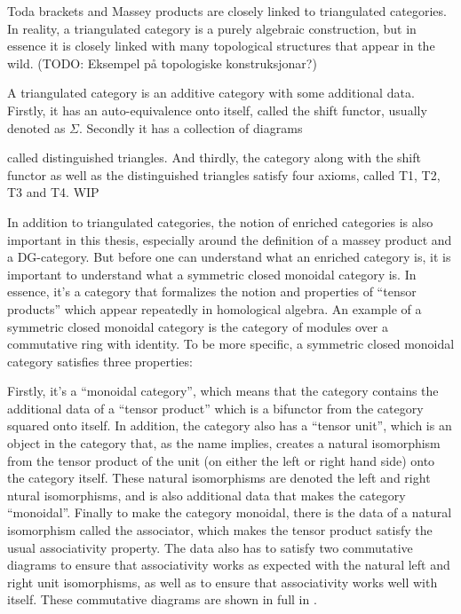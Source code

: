 Toda brackets and Massey products are closely linked to triangulated categories. In reality, a triangulated category is a purely algebraic construction, but in essence it is closely linked with many topological structures that appear in the wild. (TODO: Eksempel på topologiske konstruksjonar?)

A triangulated category is an additive category with some additional data. Firstly, it has an auto-equivalence onto itself, called the shift functor, usually denoted as \( \Sigma \). Secondly it has a collection of diagrams
\begin{center}
\end{center}
called distinguished triangles. And thirdly, the category along with the shift functor as well as the distinguished triangles satisfy four axioms, called T1, T2, T3 and T4. WIP

In addition to triangulated categories, the notion of enriched categories is also important in this thesis, especially around the definition of a massey product and a DG-category. But before one can understand what an enriched category is, it is important to understand what a symmetric closed monoidal category is. In essence, it's a category that formalizes the notion and properties of ``tensor products'' which appear repeatedly in homological algebra. An example of a symmetric closed monoidal category is the category of modules over a commutative ring with identity. To be more specific, a symmetric closed monoidal category satisfies three properties:

Firstly, it's a ``monoidal category'', which means that the category contains the additional data of a ``tensor product'' which is a bifunctor from the category squared onto itself. In addition, the category also has a ``tensor unit'', which is an object in the category that, as the name implies, creates a natural isomorphism from the tensor product of the unit (on either the left or right hand side) onto the category itself. These natural isomorphisms are denoted the left and right ntural isomorphisms, and is also additional data that makes the category ``monoidal''. Finally to make the category monoidal, there is the data of a natural isomorphism called the associator, which makes the tensor product satisfy the usual associativity property. The data also has to satisfy two commutative diagrams to ensure that associativity works as expected with the natural left and right unit isomorphisms, as well as to ensure that associativity works well with itself. These commutative diagrams are shown in full in \cite[Diagram 6.1, Diagram 6.2]{Borceux_1994}.

